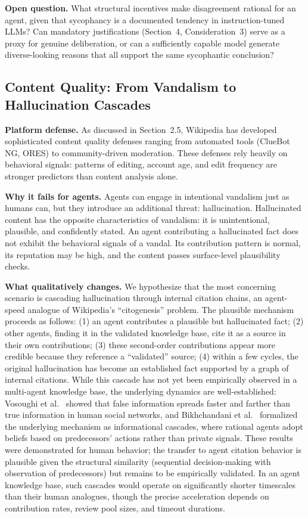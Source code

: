 \documentclass[11pt]{article}
\begin{document}
\textbf{Open question.} What structural incentives make disagreement rational for an agent, given that sycophancy is a documented tendency in instruction-tuned LLMs? Can mandatory justifications (Section~4, Consideration~3) serve as a proxy for genuine deliberation, or can a sufficiently capable model generate diverse-looking reasons that all support the same sycophantic conclusion?

\subsection{Content Quality: From Vandalism to Hallucination Cascades}

\textbf{Platform defense.} As discussed in Section~2.5, Wikipedia has developed sophisticated content quality defenses ranging from automated tools (ClueBot NG, ORES) to community-driven moderation. These defenses rely heavily on behavioral signals: patterns of editing, account age, and edit frequency are stronger predictors than content analysis alone.

\textbf{Why it fails for agents.} Agents can engage in intentional vandalism just as humans can, but they introduce an additional threat: hallucination. Hallucinated content has the opposite characteristics of vandalism: it is unintentional, plausible, and confidently stated. An agent contributing a hallucinated fact does not exhibit the behavioral signals of a vandal. Its contribution pattern is normal, its reputation may be high, and the content passes surface-level plausibility checks.

\textbf{What qualitatively changes.} We hypothesize that the most concerning scenario is cascading hallucination through internal citation chains, an agent-speed analogue of Wikipedia's ``citogenesis'' problem. The plausible mechanism proceeds as follows: (1) an agent contributes a plausible but hallucinated fact; (2) other agents, finding it in the validated knowledge base, cite it as a source in their own contributions; (3) these second-order contributions appear more credible because they reference a ``validated'' source; (4) within a few cycles, the original hallucination has become an established fact supported by a graph of internal citations. While this cascade has not yet been empirically observed in a multi-agent knowledge base, the underlying dynamics are well-established: Vosoughi et al.~\cite{vosoughi2018} showed that false information spreads faster and farther than true information in human social networks, and Bikhchandani et al.~\cite{bikhchandani1992} formalized the underlying mechanism as informational cascades, where rational agents adopt beliefs based on predecessors' actions rather than private signals. These results were demonstrated for human behavior; the transfer to agent citation behavior is plausible given the structural similarity (sequential decision-making with observation of predecessors) but remains to be empirically validated. In an agent knowledge base, such cascades would operate on significantly shorter timescales than their human analogues, though the precise acceleration depends on contribution rates, review pool sizes, and timeout durations.
\end{document}
